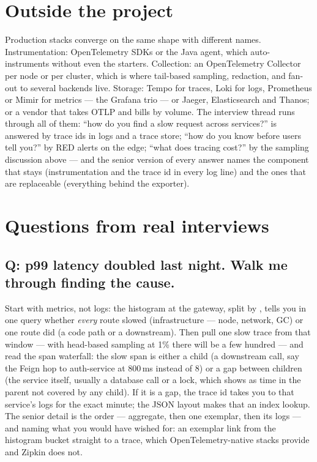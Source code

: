 \section{Outside the project}

Production stacks converge on the same shape with different names.
Instrumentation: OpenTelemetry SDKs or the Java agent, which
auto-instruments without even the starters. Collection: an
OpenTelemetry Collector per node or per cluster, which is where
tail-based sampling, redaction, and fan-out to several backends live.
Storage: Tempo for traces, Loki for logs, Prometheus or Mimir for
metrics --- the Grafana trio --- or Jaeger, Elasticsearch and Thanos;
or a vendor that takes OTLP and bills by volume. The interview thread
runs through all of them: ``how do you find a slow request across
services?'' is answered by trace ids in logs and a trace store; ``how
do you know before users tell you?'' by RED alerts on the edge; ``what
does tracing cost?'' by the sampling discussion above --- and the
senior version of every answer names the component that stays
(instrumentation and the trace id in every log line) and the ones that
are replaceable (everything behind the exporter).

\section{Questions from real interviews}

\subsection*{Q: p99 latency doubled last night. Walk me through finding the cause.}

Start with metrics, not logs: the  histogram
at the gateway, split by , tells you in one query whether
\emph{every} route slowed (infrastructure --- node, network, GC) or one
route did (a code path or a downstream). Then pull one slow trace from
that window --- with head-based sampling at 1\% there will be a few
hundred --- and read the span waterfall: the slow span is either a
child (a downstream call, say the Feign hop to auth-service at 800\,ms
instead of 8) or a gap between children (the service itself, usually a
database call or a lock, which shows as time in the parent not covered
by any child). If it is a gap, the trace id takes you to that service's
logs for the exact minute; the JSON layout makes that an index lookup.
The senior detail is the order --- aggregate, then one exemplar, then
its logs --- and naming what you would have wished for: an exemplar
link from the histogram bucket straight to a trace, which
OpenTelemetry-native stacks provide and Zipkin does not.

